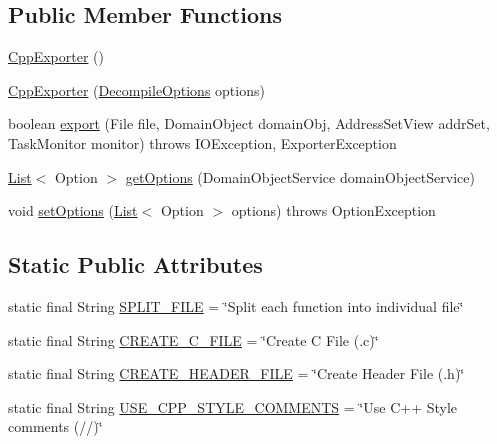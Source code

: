 \subsection*{Public Member Functions}
\begin{DoxyCompactItemize}
\item 
\mbox{\hyperlink{classghidra_1_1app_1_1util_1_1exporter_1_1_cpp_exporter_aa70134a36c4702c4ca2aa739d4ecb069}{Cpp\+Exporter}} ()
\item 
\mbox{\hyperlink{classghidra_1_1app_1_1util_1_1exporter_1_1_cpp_exporter_aa63fe1218bd22aff8442f82177316242}{Cpp\+Exporter}} (\mbox{\hyperlink{classghidra_1_1app_1_1decompiler_1_1_decompile_options}{Decompile\+Options}} options)
\item 
boolean \mbox{\hyperlink{classghidra_1_1app_1_1util_1_1exporter_1_1_cpp_exporter_a14744ddee89ddd39c3181638d6f61829}{export}} (File file, Domain\+Object domain\+Obj, Address\+Set\+View addr\+Set, Task\+Monitor monitor)  throws I\+O\+Exception, Exporter\+Exception 
\item 
\mbox{\hyperlink{xml_8hh_ab5ab62f46b3735557c125f91b40ac155}{List}}$<$ Option $>$ \mbox{\hyperlink{classghidra_1_1app_1_1util_1_1exporter_1_1_cpp_exporter_a3d2249434f43ed52c0afd1350b61c7f1}{get\+Options}} (Domain\+Object\+Service domain\+Object\+Service)
\item 
void \mbox{\hyperlink{classghidra_1_1app_1_1util_1_1exporter_1_1_cpp_exporter_af27de4dbf4a23c38ad0f9a279d771306}{set\+Options}} (\mbox{\hyperlink{xml_8hh_ab5ab62f46b3735557c125f91b40ac155}{List}}$<$ Option $>$ options)  throws Option\+Exception 
\end{DoxyCompactItemize}
\subsection*{Static Public Attributes}
\begin{DoxyCompactItemize}
\item 
static final String \mbox{\hyperlink{classghidra_1_1app_1_1util_1_1exporter_1_1_cpp_exporter_ab88db531fdcc5f646626de9fc968a392}{S\+P\+L\+I\+T\+\_\+\+F\+I\+LE}} = \char`\"{}Split each function into individual file\char`\"{}
\item 
static final String \mbox{\hyperlink{classghidra_1_1app_1_1util_1_1exporter_1_1_cpp_exporter_a5387c584e3832434f2b526ab1fdadb11}{C\+R\+E\+A\+T\+E\+\_\+\+C\+\_\+\+F\+I\+LE}} = \char`\"{}Create C File (.c)\char`\"{}
\item 
static final String \mbox{\hyperlink{classghidra_1_1app_1_1util_1_1exporter_1_1_cpp_exporter_a9309e0ba15cab870340709c802576572}{C\+R\+E\+A\+T\+E\+\_\+\+H\+E\+A\+D\+E\+R\+\_\+\+F\+I\+LE}} = \char`\"{}Create Header File (.h)\char`\"{}
\item 
static final String \mbox{\hyperlink{classghidra_1_1app_1_1util_1_1exporter_1_1_cpp_exporter_a7abe700c2b065b59172b8e00bae2e4a1}{U\+S\+E\+\_\+\+C\+P\+P\+\_\+\+S\+T\+Y\+L\+E\+\_\+\+C\+O\+M\+M\+E\+N\+TS}} = \char`\"{}Use C++ Style comments (//)\char`\"{}
\end{DoxyCompactItemize}



